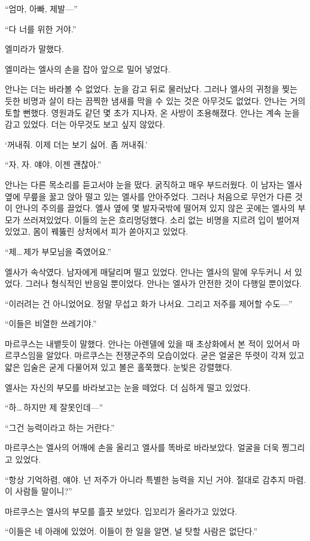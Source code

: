 ``엄마, 아빠, 제발—''

``다 너를 위한 거야.''

엘미라가 말했다.

엘미라는 엘사의 손을 잡아 앞으로 밀어 넣었다.

안나는 더는 바라볼 수 없었다. 눈을 감고 뒤로 물러났다. 그러나 엘사의 귀청을 찢는 듯한 비명과 살이 타는 끔찍한 냄새를 막을 수 있는 것은 아무것도 없었다. 안나는 거의 토할 뻔했다. 영원과도 같던 몇 초가 지나자, 온 사방이 조용해졌다. 안나는 계속 눈을 감고 있었다. 더는 아무것도 보고 싶지 않았다. 

`꺼내줘. 이제 더는 보기 싫어. 좀 꺼내줘.'

``자, 자. 얘야, 이젠 괜찮아.''

안나는 다른 목소리를 듣고서야 눈을 떴다. 굵직하고 매우 부드러웠다. 이 남자는 엘사 옆에 무릎을 꿇고 앉아 떨고 있는 엘사를 안아주었다. 그러나 처음으로 무언가 다른 것이 안나의 주의를 끌었다. 엘사 옆에 몇 발자국밖에 떨어져 있지 않은 곳에는 엘사의 부모가 쓰러져있었다. 이들의 눈은 흐리멍덩했다. 소리 없는 비명을 지르려 입이 벌어져 있었고, 몸이 꿰뚫린 상처에서 피가 쏟아지고 있었다.

``제\ldots\,제가 부모님을 죽였어요.''

엘사가 속삭였다. 남자에게 매달리며 떨고 있었다. 안나는 엘사의 말에 우두커니 서 있었다. 그러나 형식적인 반응일 뿐이었다. 안나는 엘사가 안전한 것이 다행일 뿐이었다.

``이러려는 건 아니었어요. 정말 무섭고 화가 나서요. 그리고 저주를 제어할 수도—''

``이들은 비열한 쓰레기야.''

마르쿠스는 내뱉듯이 말했다. 안나는 아렌델에 있을 때 초상화에서 본 적이 있어서 마르쿠스임을 알았다. 마르쿠스는 전쟁군주의 모습이었다. 굳은 얼굴은 뚜렷이 각져 있고 얇은 입술은 굳게 다물어져 있고 볼은 홀쭉했다. 눈빛은 강렬했다. 

엘사는 자신의 부모를 바라보고는 눈을 떼었다. 더 심하게 떨고 있었다.

``하\ldots\,하지만 제 잘못인데—''

``그건 능력이라고 하는 거란다.''

마르쿠스는 엘사의 어깨에 손을 올리고 엘사를 똑바로 바라보았다. 얼굴을 더욱 찡그리고 있었다.

``항상 기억하렴, 얘야. 넌 저주가 아니라 특별한 능력을 지닌 거야. 절대로 감추지 마렴. 이 사람들 말이니?''

마르쿠스는 엘사의 부모를 흘끗 보았다. 입꼬리가 올라가고 있었다.

``이들은 네 아래에 있었어. 이들이 한 일을 알면, 널 탓할 사람은 없단다.''


